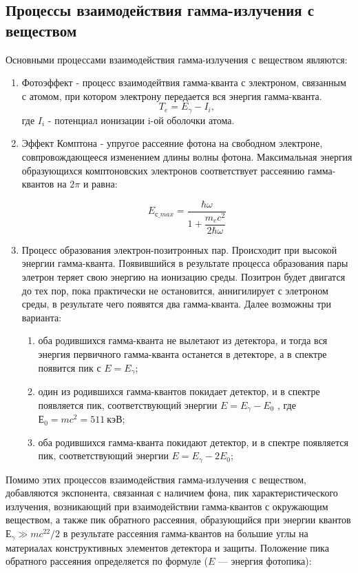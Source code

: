 \documentclass{article}
\begin{document}
\subsection*{Процессы взаимодействия гамма-излучения с веществом}
Основными процессами взаимодействия гамма-излучения с веществом являются:
\begin{enumerate}
    \item Фотоэффект - процесс взаимодейтвия гамма-кванта с электроном, связанным с атомом, при котором электрону передается вся энергия гамма-кванта. 
    \begin{equation*}
        T_e = E_{\gamma} - I_i,
    \end{equation*}
    где $I_i$ - потенциал ионизации i-ой оболочки атома.
    \item Эффект Комптона - упругое рассеяние фотона на свободном электроне, совпровождающееся изменением длины волны фотона. Максимальная энергия образующихся комптоновских электронов соответствует рассеянию гамма-квантов на $ 2\pi $ и равна:
	
	\begin{equation}\label{E_compton}
	E_{с \_ max} = \dfrac{\hbar \omega}{1 + \dfrac{m_ec^2}{2\hbar\omega}}
	\end{equation}
 
    \item Процесс образования электрон-позитронных пар. Происходит при высокой энергии гамма-кванта. Появившийся в результате процесса образования пары элетрон теряет свою энергию на ионизацию среды. Позитрон будет двигатся до тех пор, пока практически не остановится, аннигилирует с элетроном среды, в результате чего появятся два гамма-кванта. Далее возможны три варианта:
    \begin{enumerate}
        \item оба родившихся гамма-кванта не вылетают из детектора, и тогда вся энергия первичного гамма-кванта останется в детекторе, а в спектре появится пик с $E = E_{\gamma}$;
        \item один из родившихся гамма-квантов покидает детектор, и в спектре появляется пик, соответствующий энергии $E = E_{\gamma} - E_0$ , где $Е_0 = mc^2 =511~ кэВ$;
        \item  оба родившихся гамма-кванта покидают детектор, и в спектре появляется пик, соответствующий энергии $E = E_{\gamma} - 2E_0$;
    \end{enumerate}
\end{enumerate}
Помимо этих процессов  взаимодействия гамма-излучения с веществом, добавляются экспонента, связанная с наличием фона, пик характеристического излучения, возникающий при взаимодействии гамма-квантов с окружающим веществом, а также пик обратного рассеяния, образующийся при энергии квантов $ Е_\gamma \gg mc^22/2 $ в результате рассеяния гамма-квантов на большие углы на материалах конструктивных элементов детектора и защиты. Положение пика обратного рассеяния определяется по формуле ($ E $ --- энергия фотопика):
	
\end{document}
